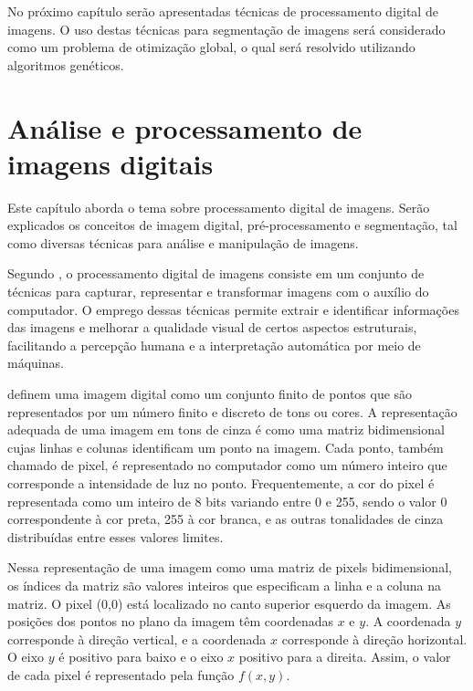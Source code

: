 \documentclass[12pt,oneside,a4paper,english,french,spanish,brazil,]{abntex2}
\begin{document}
No próximo capítulo serão apresentadas técnicas de processamento digital de imagens. O uso destas técnicas para segmentação de imagens será considerado como um problema de otimização global, o qual será resolvido utilizando algoritmos genéticos.


\chapter{Análise e processamento de imagens digitais}
\label{chap:PDI}

Este capítulo aborda o tema sobre processamento digital de imagens. Serão explicados os conceitos de imagem digital, pré-processamento e segmentação, tal como diversas técnicas para análise e manipulação de imagens.

Segundo \citet{pedrini:2008}, o processamento digital de imagens consiste em um conjunto de técnicas para capturar, representar e transformar imagens com o auxílio do computador. O emprego dessas técnicas permite extrair e identificar informações das imagens e melhorar a qualidade visual de certos aspectos estruturais, facilitando a percepção humana e a interpretação automática por meio de máquinas. 

\citet{conci:2003} definem uma imagem digital como um conjunto finito de pontos que são representados por um número finito e discreto de tons ou cores. A representação adequada de uma imagem em tons de cinza é como uma matriz bidimensional cujas linhas e colunas identificam um ponto na imagem. Cada ponto, também chamado de pixel, é representado no computador como um número inteiro que corresponde a intensidade de luz no ponto. Frequentemente, a cor do pixel é representada como um inteiro de 8 bits variando entre 0 e 255, sendo o valor 0 correspondente à cor preta, 255 à cor branca, e as outras tonalidades de cinza distribuídas entre esses valores limites.

Nessa representação de uma imagem como uma matriz de pixels bidimensional, os índices da matriz são valores inteiros que especificam a linha e a coluna na matriz. O pixel (0,0) está localizado no canto superior esquerdo da imagem. As posições dos pontos no plano da imagem têm coordenadas \(x\) e \(y\). A coordenada \(y\) corresponde à direção vertical, e a coordenada \(x\) corresponde à direção horizontal. O eixo \(y\) é positivo para baixo e o eixo \(x\) positivo para a direita. Assim, o valor de cada pixel é representado pela função \(f(x,y)\).
\end{document}
